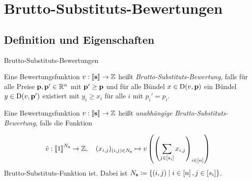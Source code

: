 \section{Brutto-Substituts-Bewertungen}
\newcommand{\tild}[1]{\widetile{#1}}
\subsection{Definition und Eigenschaften}
\begin{frame}{Brutto-Substituts-Bewertungen}
	\begin{definition}
		Eine Bewertungsfunktion $v: \left\llbracket \mathbf{s} \right\rrbracket \rightarrow \mathbb{Z}$ heißt \emph{Brutto-Substituts-Bewertung},
		falls für alle Preise $\mathbf{p},\mathbf{p}'\in\mathbb{R}^n$ mit $\mathbf{p}' \geq \mathbf{p}$ und für alle Bündel $x\in\operatorname{D}(v, \mathbf{p})$ ein Bündel $y\in\operatorname{D}(v,\mathbf{p}')$ existiert mit $y_i \geq x_i$ für alle $i$ mit $p_i' = p_i$.
		
		\pause\vspace{1em}
		
		\parbox{\textwidth}{Eine Bewertungsfunktion $v:\left\llbracket \mathbf{s} \right\rrbracket \rightarrow \mathbb{Z}$ heißt \emph{unabhängige Brutto-Substituts-Bewertung}, falls die Funktion}
		\[
		\tilde{v}:\left\llbracket 1 \right\rrbracket^{N_{\mathbf{s}}} \rightarrow \mathbb{Z}, \quad (x_{i,j})_{(i,j)\in N_{\mathbf{s}}} \mapsto v \left( \left( \sum_{j\in\left[ s_i \right]} x_{i,j} \right)_{i\in\left[ n \right]} \right)
		\]
		Brutto-Substituts-Funktion ist.
		Dabei ist $N_{\mathbf{s}} \coloneqq \{ (i,j) \mid i\in\left[ n \right], j\in\left[ s_i \right] \}$.
	\end{definition}
\end{frame}

